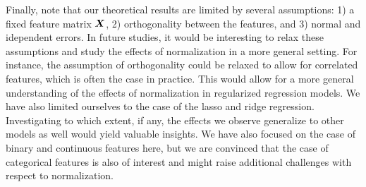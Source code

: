 Finally, note that our theoretical results are limited by several assumptions: 1) a fixed
feature matrix \(\boldsymbol{X}\), 2) orthogonality between the features, and 3) normal and
idependent errors. In future studies, it would be interesting to relax these assumptions
and study the effects of normalization in a more general setting. For instance, the
assumption of orthogonality could be relaxed to allow for correlated features, which is
often the case in practice. This would allow for a more general understanding of the
effects of normalization in regularized regression models. We have also limited ourselves
to the case of the lasso and ridge regression. Investigating to which extent, if any, the
effects we observe generalize to other models as well would yield valuable insights. We
have also focused on the case of binary and continuous features here, but we are convinced
that the case of categorical features is also of interest and might raise additional
challenges with respect to normalization.

